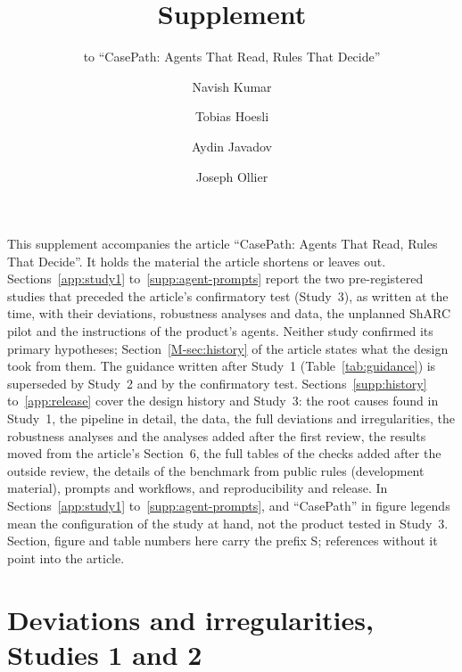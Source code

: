 \documentclass[acmsmall,screen,nonacm]{acmart}
\begin{document}
\title{Supplement}
\subtitle{to ``CasePath: Agents That Read, Rules That Decide''}

\author{Navish Kumar}
\author{Tobias Hoesli}
\author{Aydin Javadov}
\author{Joseph Ollier}
\renewcommand{\shortauthors}{Kumar et al.}

\maketitle

This supplement accompanies the article ``CasePath: Agents That Read, Rules That Decide''. It holds the material the article shortens or leaves out. Sections~\ref{app:study1} to~\ref{supp:agent-prompts} report the two pre-registered studies that preceded the article's confirmatory test (Study~3), as written at the time, with their deviations, robustness analyses and data, the unplanned ShARC pilot and the instructions of the product's agents. Neither study confirmed its primary hypotheses; Section~\ref{M-sec:history} of the article states what the design took from them. The guidance written after Study~1 (Table~\ref{tab:guidance}) is superseded by Study~2 and by the confirmatory test. Sections~\ref{supp:history} to~\ref{app:release} cover the design history and Study~3: the root causes found in Study~1, the pipeline in detail, the data, the full deviations and irregularities, the robustness analyses and the analyses added after the first review, the results moved from the article's Section~6, the full tables of the checks added after the outside review, the details of the benchmark from public rules (development material), prompts and workflows, and reproducibility and release. In Sections~\ref{app:study1} to~\ref{supp:agent-prompts}, \casepath and ``CasePath'' in figure legends mean the configuration of the study at hand, not the product tested in Study~3. Section, figure and table numbers here carry the prefix S; references without it point into the article.




\section{Deviations and irregularities, Studies 1 and 2}
\label{supp:deviations}
\end{document}
